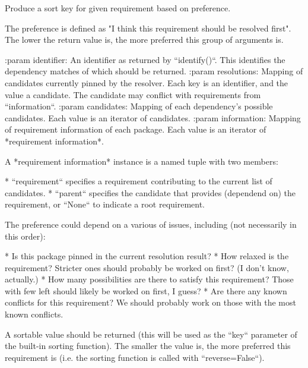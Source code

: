 \begin{DoxyVerb}Produce a sort key for given requirement based on preference.

The preference is defined as "I think this requirement should be
resolved first". The lower the return value is, the more preferred
this group of arguments is.

:param identifier: An identifier as returned by ``identify()``. This
    identifies the dependency matches of which should be returned.
:param resolutions: Mapping of candidates currently pinned by the
    resolver. Each key is an identifier, and the value a candidate.
    The candidate may conflict with requirements from ``information``.
:param candidates: Mapping of each dependency's possible candidates.
    Each value is an iterator of candidates.
:param information: Mapping of requirement information of each package.
    Each value is an iterator of *requirement information*.

A *requirement information* instance is a named tuple with two members:

* ``requirement`` specifies a requirement contributing to the current
  list of candidates.
* ``parent`` specifies the candidate that provides (dependend on) the
  requirement, or ``None`` to indicate a root requirement.

The preference could depend on a various of issues, including (not
necessarily in this order):

* Is this package pinned in the current resolution result?
* How relaxed is the requirement? Stricter ones should probably be
  worked on first? (I don't know, actually.)
* How many possibilities are there to satisfy this requirement? Those
  with few left should likely be worked on first, I guess?
* Are there any known conflicts for this requirement? We should
  probably work on those with the most known conflicts.

A sortable value should be returned (this will be used as the ``key``
parameter of the built-in sorting function). The smaller the value is,
the more preferred this requirement is (i.e. the sorting function
is called with ``reverse=False``).
\end{DoxyVerb}
 \mbox{\label{classpip_1_1__vendor_1_1resolvelib_1_1providers_1_1AbstractProvider_ab1fee658c7bf9eccba82775976d60b00}} 
